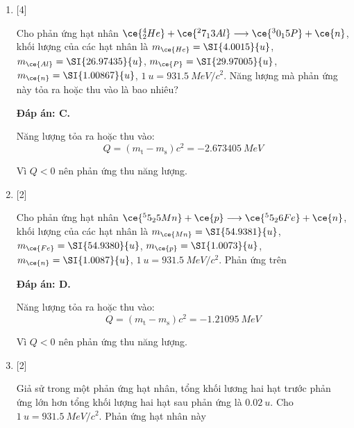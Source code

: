 \begin{enumerate}[label=\bfseries Câu \arabic*:]
{		Do $Q<0$ nên phản ứng thu năng lượng.
	}
	
	\item {} [4]
	\cauhoi
	{Cho phản ứng hạt nhân $\ce{^4_2 He} + \ce{^27_13 Al} \longrightarrow \ce{^30_15 P} + \ce{n}$, khối lượng của các hạt nhân là $m_{\ce{He}} = \SI{4.0015}{u}$, $m_{\ce{Al}} = \SI{26.97435}{u}$, $m_{\ce{P}} = \SI{29.97005}{u}$, $m_{\ce{n}} = \SI{1.00867}{u}$, $\SI{1}{u} = \SI{931.5}{MeV/c^2}$. Năng lượng mà phản ứng này tỏa ra hoặc thu vào là bao nhiêu?
	}
	
	\loigiai
	{		\textbf{Đáp án: C.}
		
		Năng lượng tỏa ra hoặc thu vào:
		$$Q=(m_{\text{t}} - m_\text{s}) c^2 = \SI{-2.673405}{MeV}$$
		
		Vì $Q<0$ nên phản ứng thu năng lượng.
		
	}
	
	\item {} [2]
	\cauhoi
	{Cho phản ứng hạt nhân $\ce{^55_25 Mn} + \ce{p} \longrightarrow \ce{^55_26 Fe} + \ce{n}$, khối lượng của các hạt nhân là $m_{\ce{Mn}} = \SI{54.9381}{u}$, $m_{\ce{Fe}} = \SI{54.9380}{u}$, $m_{\ce{p}} = \SI{1.0073}{u}$, $m_{\ce{n}} = \SI{1.0087}{u}$, $\SI{1}{u} = \SI{931.5}{MeV/c^2}$. Phản ứng trên
	}
	
	\loigiai
	{		\textbf{Đáp án: D.}
		
		Năng lượng tỏa ra hoặc thu vào:
		$$Q=(m_{\text{t}} - m_\text{s}) c^2 = \SI{-1.21095}{MeV}$$
		
		Vì $Q<0$ nên phản ứng thu năng lượng.
		
	}
	\item {} [2]
	\cauhoi
	{Giả sử trong một phản ứng hạt nhân, tổng khối lương hai hạt trước phản ứng lớn hơn tổng khối lượng hai hạt sau phản ứng là $\SI{0.02}{u}$. Cho $\SI{1}{u} = \SI{931.5}{MeV/c^2}$. Phản ứng hạt nhân này
	}
	

\end{enumerate}
